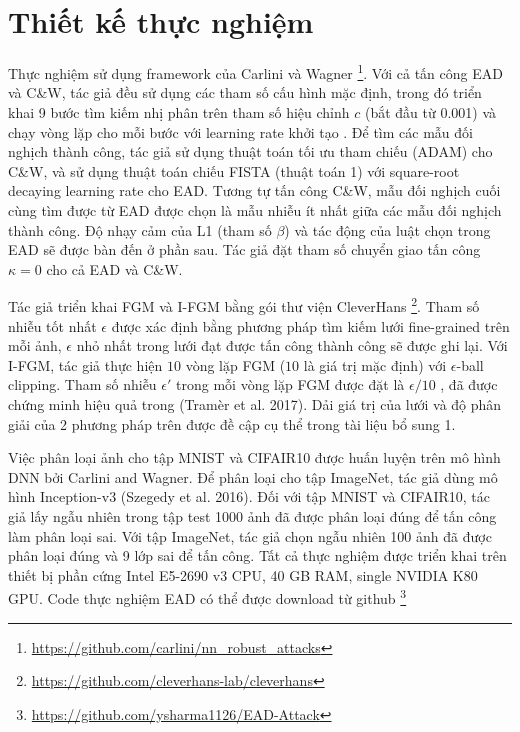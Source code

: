 \section{Thiết kế thực nghiệm}
Thực nghiệm sử dụng framework của Carlini và Wagner \footnote{\href{https://github.com/carlini/nn_robust_attacks}{https://github.com/carlini/nn\_robust\_attacks}}. Với cả tấn công EAD và C\&W, tác giả đều sử dụng các tham số cấu hình mặc định, trong đó triển khai 9 bước tìm kiếm nhị phân trên tham số hiệu chỉnh $c$ (bắt đầu từ 0.001) và chạy  vòng lặp cho mỗi bước với learning rate khởi tạo . Để tìm các mẫu đối nghịch thành công, tác giả sử dụng thuật toán tối ưu tham chiếu (ADAM) cho C\&W, và sử dụng thuật toán chiếu FISTA (thuật toán 1) với square-root decaying learning rate cho EAD. Tương tự tấn công C\&W, mẫu đối nghịch cuối cùng tìm được từ EAD được chọn là mẫu nhiễu ít nhất giữa các mẫu đối nghịch thành công. Độ nhạy cảm của L1 (tham số $\beta$) và tác động của luật chọn trong EAD sẽ được bàn đến ở phần sau. Tác giả đặt tham số chuyển giao tấn công $\kappa = 0$ cho cả EAD và C\&W.


Tác giả triển khai FGM và I-FGM bằng gói thư viện CleverHans \footnote{\href{https://github.com/cleverhans-lab/cleverhans}{https://github.com/cleverhans-lab/cleverhans}}. Tham số nhiễu tốt nhất $\epsilon$ được xác định bằng phương pháp tìm kiếm lưới fine-grained trên mỗi ảnh, $\epsilon$ nhỏ nhất trong lưới đạt được tấn công thành công sẽ được ghi lại. Với I-FGM, tác giả thực hiện $10$ vòng lặp FGM ($10$ là giá trị mặc định) với $\epsilon$-ball clipping. Tham số nhiễu $\epsilon'$ trong mỗi vòng lặp FGM được đặt là $\epsilon/10$ , đã được chứng minh hiệu quả trong (Tramèr et al. 2017). Dải giá trị của lưới và độ phân giải của 2 phương pháp trên được đề cập cụ thể trong tài liệu bổ sung 1.

Việc phân loại ảnh cho tập MNIST và CIFAIR10 được huấn luyện trên mô hình DNN bởi Carlini and Wagner. Để phân loại cho tập ImageNet, tác giả dùng mô hình Inception-v3 (Szegedy et al. 2016). Đối với tập MNIST và CIFAIR10, tác giả lấy ngẫu nhiên trong tập test 1000 ảnh đã được phân loại đúng để tấn công làm phân loại sai. Với tập ImageNet, tác giả chọn ngẫu nhiên 100 ảnh đã được phân loại đúng và 9 lớp sai để tấn công. Tất cả thực nghiệm được triển khai trên thiết bị phần cứng Intel E5-2690 v3 CPU, 40 GB RAM, single NVIDIA K80 GPU. Code thực nghiệm EAD có thể được download từ github \footnote{\href{https://github.com/ysharma1126/EAD-Attack}{https://github.com/ysharma1126/EAD-Attack}}
